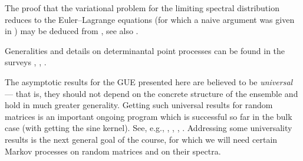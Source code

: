 \documentclass[letterpaper,11pt,oneside,reqno]{amsart}
\numberwithin{equation}{section}
\theoremstyle{definition}
\begin{document}
The proof that the variational problem for the limiting spectral distribution
reduces to the Euler--Lagrange equations
(for which a naive argument was given in )
may be deduced from \cite{saff2013logarithmic}, see also \cite{Forrester-LogGas}.

Generalities and details on determinantal point processes can be found in the 
surveys \cite{Soshnikov2000}, 
\cite{peres2006determinantal},
\cite{Borodin2009}.

The asymptotic results for the GUE presented here
are believed to be \emph{universal} --- that is,
they should not depend on the concrete structure of the 
ensemble and hold in much greater generality. 
Getting such universal results for random matrices 
is an important ongoing program which is successful so far in 
the bulk case (with getting the sine kernel).
See, e.g.,
\cite{Johansson2001Universality}, \cite{tao2011univ},
\cite{TaoVu2012Survey}, \cite{erdHos2011universality}.
Addressing some universality results is the next general goal of the course, for which we 
will need certain Markov processes on random matrices and on their spectra.









\end{document}
